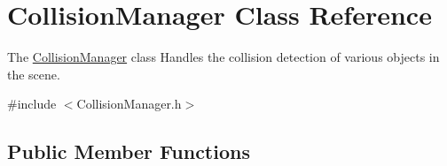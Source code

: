 \hypertarget{class_collision_manager}{}\section{Collision\+Manager Class Reference}
\label{class_collision_manager}


The \hyperlink{class_collision_manager}{Collision\+Manager} class Handles the collision detection of various objects in the scene.  




{\ttfamily \#include $<$Collision\+Manager.\+h$>$}

\subsection*{Public Member Functions}
